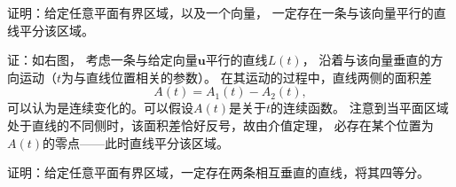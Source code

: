 \begin{shaded}
\bs
\egz 证明：给定任意平面有界区域，以及一个向量，
一定存在一条与该向量平行的直线平分该区域。

证：如右图，
考虑一条与给定向量$\bm{u}$平行的直线$L(t)$，
沿着与该向量垂直的方向运动（$t$为与直线位置相关的参数）。
在其运动的过程中，直线两侧的面积差
$$A(t)=A_1(t)-A_2(t),$$
可以认为是连续变化的。可以假设{\kaishu $A(t)$是关于$t$的连续函数}。
注意到当平面区域处于直线的不同侧时，该面积差恰好反号，故由介值定理，
必存在某个位置为$A(t)$的零点——此时直线平分该区域。\fin 

\bs
\egz 证明：给定任意平面有界区域，一定存在两条相互垂直的直线，将其四等分。


\end{shaded}
